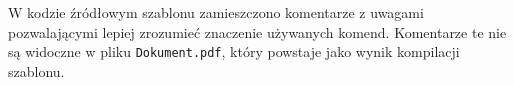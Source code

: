 W kodzie źródłowym szablonu zamieszczono komentarze z uwagami pozwalającymi lepiej zrozumieć znaczenie używanych komend. Komentarze te nie są widoczne w pliku \texttt{Dokument.pdf}, który powstaje jako wynik kompilacji szablonu. 


